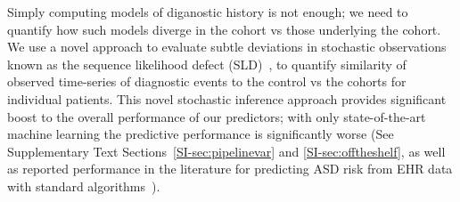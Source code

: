 \documentclass[onecolumn,10pt]{IEEEtran}
\begin{document}
{\HCOL Simply computing models of diganostic history is not enough; we need to quantify how such models diverge in the \treatment cohort vs those underlying the \control cohort.}
We use a novel approach to evaluate subtle deviations in stochastic observations known as the sequence likelihood defect (SLD)~\cite{huang2019data}, to  quantify similarity of observed time-series of diagnostic events to the control vs the \treatment cohorts for individual patients. This novel stochastic inference approach provides  significant boost to the overall performance of our predictors; with only state-of-the-art machine learning  the predictive performance is significantly worse (See Supplementary Text Sections~\ref{SI-sec:pipelinevar} and \ref{SI-sec:offtheshelf}, as well as reported performance in the literature for predicting ASD risk from EHR data with standard algorithms~\cite{lingren2016electronic}).
\end{document}
